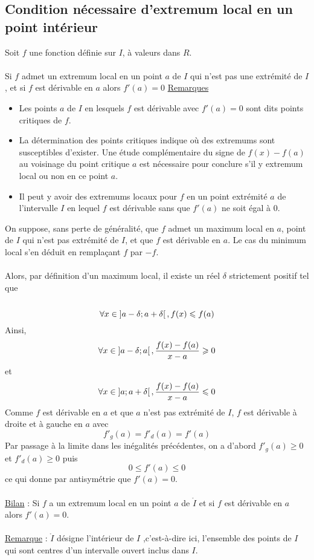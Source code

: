 \subsection{Condition nécessaire d’extremum local en un point intérieur}
\begin{defprop}
	Soit \(f\) une fonction définie sur \(I\), à valeurs dans \(R\).\\~\\
	Si \(f\) admet un extremum local en un point \(a\) de \(I\) qui n’est pas une extrémité de \(I\), et si \(f\) est dérivable en \(a\) alors \(f '(a) = 0\)
	\underline{Remarques}
	\begin{itemize}
		\item Les points \(a\) de \(I\) en lesquels \(f\) est dérivable avec \(f '(a) = 0\) sont dits points critiques de \(f\).
		\item La détermination des points critiques indique où des extremums sont susceptibles d’exister. Une étude complémentaire du signe de \(f (x) - f (a)\) au voisinage du point critique \(a\) est nécessaire pour conclure s’il y extremum local ou non en ce point \(a\).
		\item Il peut y avoir des extremums locaux pour \(f\) en un point extrémité \(a\) de l’intervalle \(I\) en lequel \(f\) est dérivable sans que \(f '(a)\) ne soit égal à \(0\).
	\end{itemize}
\end{defprop}

\begin{dem}
    On suppose, sans perte de généralité, que \(f\) admet un maximum local en \(a\), point de \(I\) qui n’est pas extrémité de \(I\), et que \(f\) est dérivable en \(a\). Le cas du minimum local s’en déduit en remplaçant \(f\) par \(-f\).\\~\\
    Alors, par définition d’un maximum local, il existe un réel \(\delta\) strictement positif tel que \\~\\
    \[\forall x \in \left]a-\delta;a+\delta\right[,f(x)\leqslant f(a)\]
    Ainsi, 
    \[\forall x \in \left]a-\delta;a\right[,\frac{f(x)-f(a)}{x-a}\geqslant 0\]
    et
    \[\forall x \in \left]a;a+\delta\right[,\frac{f(x)-f(a)}{x-a}\leqslant 0\]
    Comme \(f\) est dérivable en \(a\) et que \(a\) n'est pas extrémité de \(I\), \(f\) est dérivable à droite et à gauche en \(a\) avec
    \[f'_g(a) = f'_d(a) = f'(a)\]
    Par passage à la limite dans les inégalités précédentes, on a d’abord \(f '_g(a) \geq 0\) et \(f '_d(a) \geq 0\) puis
    \[0 \leq f '(a) \leq 0\]
    ce qui donne par antisymétrie que \(f '(a) = 0\).\\~\\
    \underline{Bilan} : Si \(f\) a un extremum local en un point \(a\) de \(\mathring{I}\) et si \(f\) est dérivable en \(a\) alors \(f '(a) = 0\).\\~\\
    \underline{Remarque} : \(\mathring{I}\) désigne l’intérieur de \(I\) ,c’est-à-dire ici, l’ensemble des points de \(I\) qui sont centres d’un intervalle ouvert inclus dans \(I\).
\end{dem}

